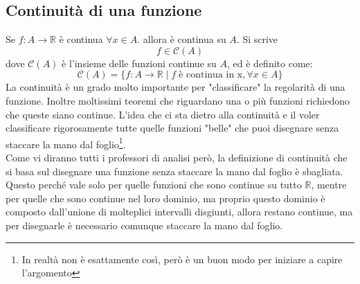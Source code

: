 \subsection{Continuità di una funzione}
Se $f:A \to \mathbb{R}$ è continua $\forall x \in A$. allora è continua su $A$. Si scrive
\begin{equation*}
    f \in \mathcal{C} (A)
\end{equation*}
dove $\mathcal{C}(A)$ è l'insieme delle funzioni continue su $A$, ed è definito come:
\begin{equation*}
    \mathcal{C}(A) = \{ f:A\to \mathbb{R}\; |\; f\; \text{è continua in x}, \forall x \in A \}
\end{equation*}
La continuità è un grado molto importante per "classificare" la regolarità di una funzione. Inoltre moltissimi teoremi che riguardano una o più funzioni richiedono che queste siano continue. L'idea che ci sta dietro alla continuità e il voler classificare rigorosamente tutte quelle funzioni "belle" che puoi disegnare senza staccare la mano dal foglio\footnote{In realtà non è esattamente così, però è un buon modo per iniziare a capire l'argomento}.\\
Come vi diranno tutti i professori di analisi però, la definizione di continuità che si basa sul disegnare una funzione senza staccare la mano dal foglio è sbagliata. Questo perché vale solo per quelle funzioni che sono continue su tutto $\mathbb{R}$, mentre per quelle che sono continue nel loro dominio, ma proprio questo dominio è composto dall'unione di molteplici intervalli disgiunti, allora restano continue, ma per disegnarle è necessario comunque staccare la mano dal foglio. %


